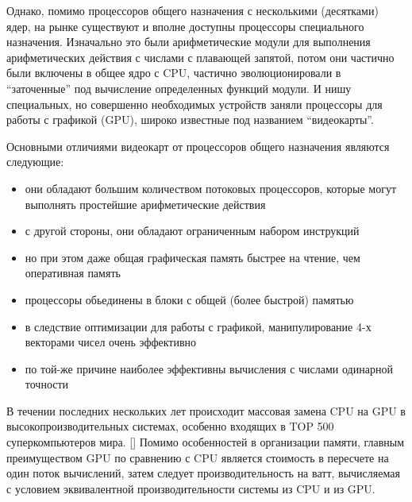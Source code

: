         Однако, помимо процессоров общего назначения с несколькими (десятками) ядер, на рынке существуют и вполне доступны процессоры специального назначения. Изначально это были арифметические модули для выполнения арифметических действия с числами с плавающей запятой, потом они частично были включены в общее ядро с CPU, частично эволюционировали в ``заточенные'' под вычисление определенных функций модули. И нишу специальных, но совершенно необходимых устройств заняли процессоры для работы с графикой (GPU), широко известные под названием ``видеокарты''.

        Основными отличиями видеокарт от процессоров общего назначения являются следующие:
        \begin{itemize}
            \item они обладают большим количеством потоковых процессоров, которые могут выполнять простейшие арифметические действия
            \item с другой стороны, они обладают ограниченным набором инструкций
            \item но при этом даже общая графическая память быстрее на чтение, чем оперативная память
            \item процессоры обьединены в блоки с общей (более быстрой) памятью
            \item в следствие оптимизации для работы с графикой, манипулирование 4-х векторами чисел очень эффективно
            \item по той-же причине наиболее эффективны вычисления с числами одинарной точности
        \end{itemize}
        В течении последних нескольких лет происходит массовая замена CPU на GPU в высокопроизводительных системах, особенно входящих в TOP 500 суперкомпьютеров мира. [] Помимо особенностей в организации памяти, главным преимуществом GPU по сравнению с CPU является стоимость в пересчете на один поток вычислений, затем следует производительность на ватт, вычисляемая с условием эквивалентной производительности системы из CPU и из GPU.

